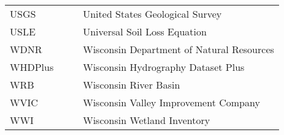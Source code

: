 \begin{tabular}{l c c l}
USGS 	&	& &	United States Geological Survey \\
USLE	&	& &	Universal Soil Loss Equation	\\
WDNR	&	& &	Wisconsin Department of Natural Resources \\
WHDPlus	&	& &	Wisconsin Hydrography Dataset Plus \\
WRB		&	& &	Wisconsin River Basin			\\
WVIC	&	& &	Wisconsin Valley Improvement Company \\
WWI		&	& &	Wisconsin Wetland Inventory		\\
\end{tabular}

\clearpage
